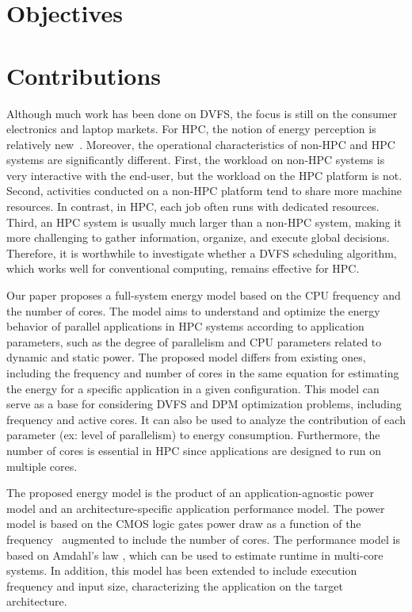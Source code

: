 \section{Objectives}


\section{Contributions}

Although much work has been done on DVFS, the focus is still on the consumer electronics and laptop markets. 
For HPC, the notion of energy perception is relatively new~\cite{Feng2003MakingSupercomputing}. 
Moreover, the operational characteristics of non-HPC and HPC systems are significantly different. 
First, the workload on non-HPC systems is very interactive with the end-user, but the workload on the HPC platform is not.
Second, activities conducted on a non-HPC platform tend to share more machine resources.
In contrast, in HPC, each job often runs with dedicated resources. 
Third, an HPC system is usually much larger than a non-HPC system, making it more challenging to gather information, organize, and execute global decisions.
Therefore, it is worthwhile to investigate whether a DVFS scheduling algorithm, which works well for conventional computing, remains effective for HPC.

Our paper proposes a full-system energy model based on the CPU frequency and the number of cores. The model aims to understand and optimize the energy behavior of parallel applications in HPC systems according to application parameters, such as the degree of parallelism and CPU parameters related to dynamic and static power. The proposed model differs from existing ones, including the frequency and number of cores in the same equation for estimating the energy for a specific application in a given configuration. This model can serve as a base for considering DVFS and DPM optimization problems, including frequency and active cores. It can also be used to analyze the contribution of each parameter (ex: level of parallelism) to energy consumption. Furthermore, the number of cores is essential in HPC since applications are designed to run on multiple cores.

The proposed energy model is the product of an application-agnostic power model and an architecture-specific application performance model. The power model is based on the CMOS logic gates power draw as a function of the frequency~\cite{Sarwar1997CmosCalculation, Butzen2007LeakageGates} augmented to include the number of cores. The performance model is based on Amdahl's law \cite{Amdahl1967ValidityCapabilities, Eyerman2010ModelingDesign, Gustafson1988ReevaluatingLaw}, which can be used to estimate runtime in multi-core systems. In addition, this model has been extended to include execution frequency and input size, characterizing the application on the target architecture.


